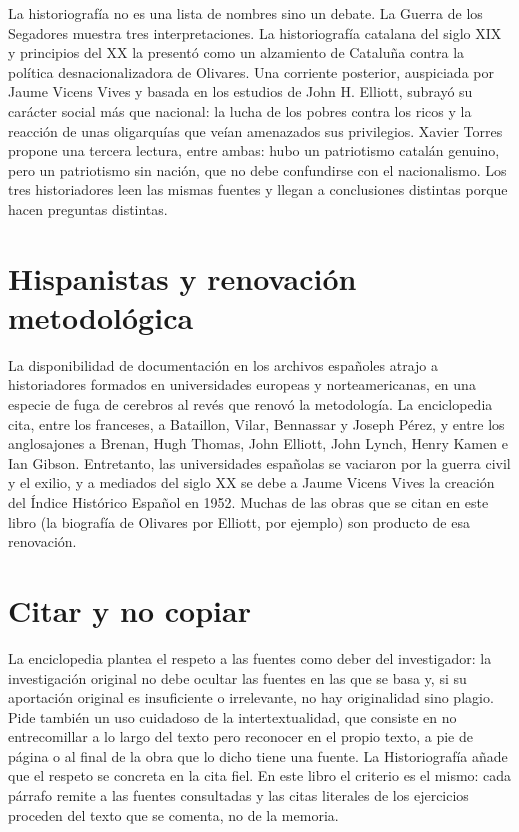 \documentclass{book}
\begin{document}
La historiografía no es una lista de nombres sino un debate. La Guerra de los Segadores muestra tres interpretaciones. La historiografía catalana del siglo XIX y principios del XX la presentó como un alzamiento de Cataluña contra la política desnacionalizadora de Olivares. Una corriente posterior, auspiciada por Jaume Vicens Vives y basada en los estudios de John H. Elliott, subrayó su carácter social más que nacional: la lucha de los pobres contra los ricos y la reacción de unas oligarquías que veían amenazados sus privilegios. Xavier Torres propone una tercera lectura, entre ambas: hubo un patriotismo catalán genuino, pero un patriotismo sin nación, que no debe confundirse con el nacionalismo. Los tres historiadores leen las mismas fuentes y llegan a conclusiones distintas porque hacen preguntas distintas.


\section{Hispanistas y renovación metodológica}

La disponibilidad de documentación en los archivos españoles atrajo a historiadores formados en universidades europeas y norteamericanas, en una especie de fuga de cerebros al revés que renovó la metodología. La enciclopedia cita, entre los franceses, a Bataillon, Vilar, Bennassar y Joseph Pérez, y entre los anglosajones a Brenan, Hugh Thomas, John Elliott, John Lynch, Henry Kamen e Ian Gibson. Entretanto, las universidades españolas se vaciaron por la guerra civil y el exilio, y a mediados del siglo XX se debe a Jaume Vicens Vives la creación del Índice Histórico Español en 1952. Muchas de las obras que se citan en este libro (la biografía de Olivares por Elliott, por ejemplo) son producto de esa renovación.


\section{Citar y no copiar}

La enciclopedia plantea el respeto a las fuentes como deber del investigador: la investigación original no debe ocultar las fuentes en las que se basa y, si su aportación original es insuficiente o irrelevante, no hay originalidad sino plagio. Pide también un uso cuidadoso de la intertextualidad, que consiste en no entrecomillar a lo largo del texto pero reconocer en el propio texto, a pie de página o al final de la obra que lo dicho tiene una fuente. La Historiografía añade que el respeto se concreta en la cita fiel. En este libro el criterio es el mismo: cada párrafo remite a las fuentes consultadas y las citas literales de los ejercicios proceden del texto que se comenta, no de la memoria.
\end{document}

